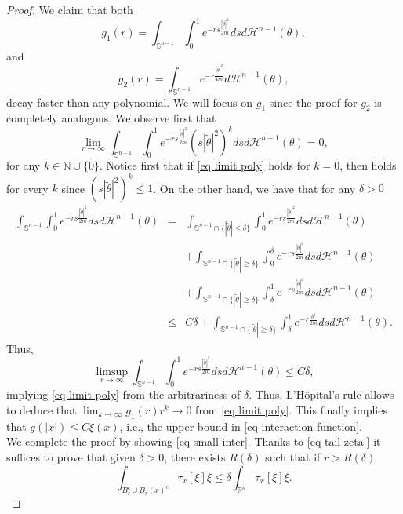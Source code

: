 \documentclass[11pt,letterpaper,reqno]{amsart}
\newcommand{\N}{\mathbb{N}}
\newcommand{\R}{\mathbb{R}}
\theoremstyle{plain}%
\theoremstyle{definition}
\numberwithin{equation}{section}
\numberwithin{figure}{section}
\begin{document}
\begin{proof}
We claim that both 
$$g_1(r) = \int_{\mathbb{S}^{n-1}}\int_{0}^{1}  e^{-  rs\frac{|\tilde \theta|^2}{2m}} dsd\mathcal{H}^{n-1}(\theta),$$
 and
 $$g_2(r)= \int_{\mathbb{S}^{n-1}}  e^{-  r\frac{|\tilde \theta|^2}{4m}}d\mathcal{H}^{n-1}(\theta),$$
  decay faster than any polynomial. We will focus on $g_1$ since the proof for $g_2$ is completely analogous. We observe first that
  \begin{equation}\label{eq limit poly}
  	\lim_{r\to \infty} \int_{\mathbb{S}^{n-1}}\int_{0}^{1} e^{-  rs\frac{|\tilde \theta|^2}{2m}} (s|\tilde \theta|^2)^k dsd\mathcal{H}^{n-1}(\theta)=0,
  \end{equation}
  for any $k\in \N\cup \{0\}$. Notice first that if \eqref{eq limit poly} holds for $k=0$, then holds for every $k$ since $(s|\tilde \theta|^2)^k\leq 1$. On the other hand, we have that for any $\delta>0$ 
   \begin{eqnarray*}
  \int_{\mathbb{S}^{n-1}}\int_{0}^{1} e^{-  rs\frac{|\tilde{\theta}|^2}{2m}}  dsd\mathcal{H}^{n-1}(\theta)&=&  \int_{\mathbb{S}^{n-1}\cap \{|\tilde \theta| \leq \delta \}}\int_{0}^{1}  e^{-  rs\frac{|\tilde \theta|^2}{2m}}  dsd\mathcal{H}^{n-1}(\theta)\\
  &&+  \int_{\mathbb{S}^{n-1}\cap \{|\tilde \theta| \geq \delta \}}\int_{0}^{\delta} e^{-  rs\frac{|\tilde \theta|^2}{2m}}  dsd\mathcal{H}^{n-1}(\theta) \\
  &&+ \int_{\mathbb{S}^{n-1}\cap \{|\tilde \theta| \geq \delta \}}\int_{\delta}^{1} e^{-  rs\frac{|\tilde \theta|^2}{2m}}  dsd\mathcal{H}^{n-1}(\theta)\\
  &\leq& C\delta + \int_{\mathbb{S}^{n-1}\cap \{|\tilde \theta| \geq \delta \}}\int_{\delta}^{1} e^{-  r\frac{\delta^3}{2m}}  dsd\mathcal{H}^{n-1}(\theta).
  \end{eqnarray*}
Thus,
\begin{equation*}
 \limsup_{r\to \infty}   \int_{\mathbb{S}^{n-1}}\int_{0}^{1} e^{-  rs\frac{|\tilde{\theta}|^2}{2m}}  dsd\mathcal{H}^{n-1}(\theta)\leq C\delta,
\end{equation*}
implying \eqref{eq limit poly} from the arbitrariness of $\delta$. Thus, L'H\^opital's rule allows to deduce that $\lim_{k\to \infty}g_1(r)r^k \to 0$ from \eqref{eq limit poly}. This finally implies that $g(|x|)\leq C\xi(x)$, i.e., the upper bound in \eqref{eq interaction function}.\\

We complete the proof by showing \eqref{eq small inter}. Thanks to \eqref{eq tail zeta'} it suffices to prove that given $\delta>0$, there exists $R(\delta)$ such that if $r>R(\delta)$ 
\begin{equation}\label{eq small inter2}
	\int_{ B_r^c \cup B_r(x)^c} \tau_{x}[\xi] \xi \leq \delta	\int_{\R^n} \tau_{x}[\xi] \xi .
\end{equation}


\end{proof}
\end{document}
